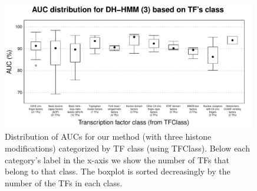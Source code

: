\documentclass{bioinfo}
\begin{document}
\begin{figure}[t]
\centering
     \includegraphics[width=0.99\textwidth]{Figs/TfQuality_Boxplot}
\caption{{\color{black} Distribution of AUCs for our method (with three histone modifications) categorized by TF class (using TFClass). Below each category's label in the x-axis we show the number of TFs that belong to that class. The boxplot is sorted decreasingly by the number of the TFs in each class.}}
\label{fig:tftest.box}
\end{figure}
\end{document}
